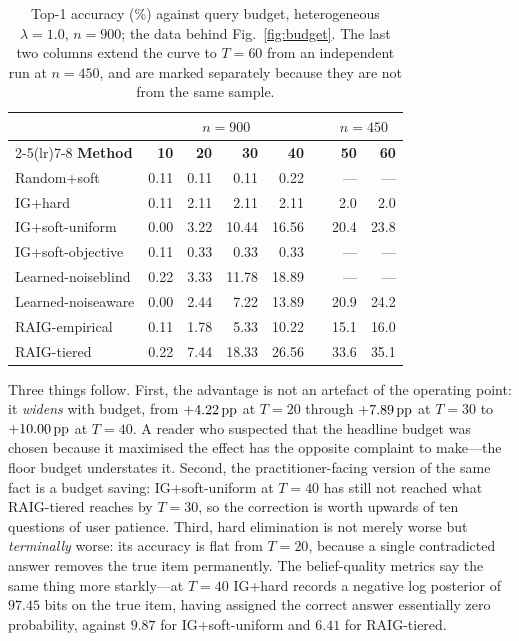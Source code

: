 \begin{table}[t]
\caption{Top-1 accuracy (\%) against query budget, heterogeneous
$\lambda = 1.0$, $n = 900$; the data behind Fig.~\ref{fig:budget}. The last two
columns extend the curve to $T=60$ from an independent run at $n=450$, and are
marked separately because they are not from the same sample.}
\label{tab:budget}
\centering
\scriptsize
\begin{tabular}{@{}lrrrrcrr@{}}
\toprule
& \multicolumn{4}{c}{$n=900$} & & \multicolumn{2}{c}{$n=450$} \\
\cmidrule(lr){2-5}\cmidrule(lr){7-8}
\textbf{Method} & \textbf{10} & \textbf{20} & \textbf{30} & \textbf{40} & &
\textbf{50} & \textbf{60} \\
\midrule
Random+soft        & 0.11 & 0.11 & 0.11  & 0.22  & & ---  & ---  \\
IG+hard            & 0.11 & 2.11 & 2.11  & 2.11  & & 2.0  & 2.0  \\
IG+soft-uniform    & 0.00 & 3.22 & 10.44 & 16.56 & & 20.4 & 23.8 \\
IG+soft-objective  & 0.11 & 0.33 & 0.33  & 0.33  & & ---  & ---  \\
Learned-noiseblind & 0.22 & 3.33 & 11.78 & 18.89 & & ---  & ---  \\
Learned-noiseaware & 0.00 & 2.44 & 7.22  & 13.89 & & 20.9 & 24.2 \\
RAIG-empirical     & 0.11 & 1.78 & 5.33  & 10.22 & & 15.1 & 16.0 \\
RAIG-tiered        & 0.22 & 7.44 & 18.33 & 26.56 & & 33.6 & 35.1 \\
\bottomrule
\end{tabular}
\end{table}

Three things follow. First, the advantage is not an artefact of the operating
point: it \emph{widens} with budget, from $+4.22\,\text{pp}$ at $T=20$ through
$+7.89\,\text{pp}$ at $T=30$ to $+10.00\,\text{pp}$ at $T=40$. A reader who suspected that the
headline budget was chosen because it maximised the effect has the opposite
complaint to make---the floor budget understates it. Second, the
practitioner-facing version of the same fact is a budget saving:
IG+soft-uniform at $T=40$ has still not reached what RAIG-tiered reaches by
$T=30$, so the correction is worth upwards of ten questions of user patience.
Third, hard elimination is not merely worse but \emph{terminally} worse: its
accuracy is flat from $T=20$, because a single contradicted answer removes the
true item permanently. The belief-quality metrics say the same thing more
starkly---at $T=40$ IG+hard records a negative log posterior of $97.45$ bits on
the true item, having assigned the correct answer essentially zero probability,
against $9.87$ for IG+soft-uniform and $6.41$ for RAIG-tiered.

